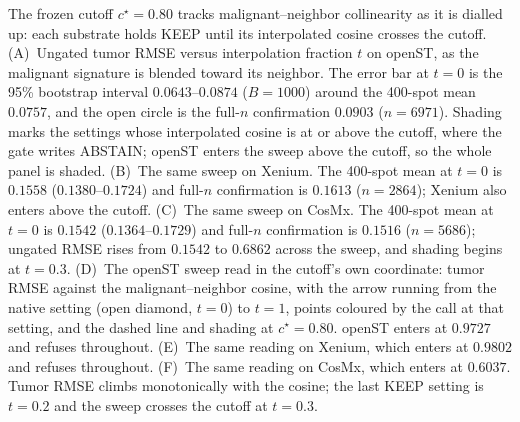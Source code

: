 The frozen cutoff \(c^\star=0.80\) tracks malignant--neighbor collinearity as it is dialled up: each substrate holds KEEP until its interpolated cosine crosses the cutoff. (A)~Ungated tumor RMSE versus interpolation fraction \(t\) on openST, as the malignant signature is blended toward its neighbor. The error bar at \(t=0\) is the 95\% bootstrap interval \(0.0643\)--\(0.0874\) (\(B=1000\)) around the 400-spot mean \(0.0757\), and the open circle is the full-\(n\) confirmation \(0.0903\) (\(n=6971\)). Shading marks the settings whose interpolated cosine is at or above the cutoff, where the gate writes ABSTAIN; openST enters the sweep above the cutoff, so the whole panel is shaded. (B)~The same sweep on Xenium. The 400-spot mean at \(t=0\) is \(0.1558\) (\(0.1380\)--\(0.1724\)) and full-\(n\) confirmation is \(0.1613\) (\(n=2864\)); Xenium also enters above the cutoff. (C)~The same sweep on CosMx. The 400-spot mean at \(t=0\) is \(0.1542\) (\(0.1364\)--\(0.1729\)) and full-\(n\) confirmation is \(0.1516\) (\(n=5686\)); ungated RMSE rises from \(0.1542\) to \(0.6862\) across the sweep, and shading begins at \(t=0.3\). (D)~The openST sweep read in the cutoff's own coordinate: tumor RMSE against the malignant--neighbor cosine, with the arrow running from the native setting (open diamond, \(t=0\)) to \(t=1\), points coloured by the call at that setting, and the dashed line and shading at \(c^\star=0.80\). openST enters at \(0.9727\) and refuses throughout. (E)~The same reading on Xenium, which enters at \(0.9802\) and refuses throughout. (F)~The same reading on CosMx, which enters at \(0.6037\). Tumor RMSE climbs monotonically with the cosine; the last KEEP setting is \(t=0.2\) and the sweep crosses the cutoff at \(t=0.3\).
